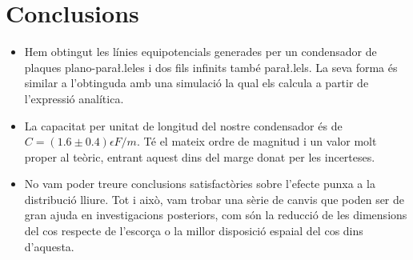 \section{Conclusions}
\begin{itemize}
	\item Hem obtingut les línies equipotencials generades per un condensador de plaques plano-para\l.leles i dos fils infinits també para\l.lels. La seva forma és similar a l'obtinguda amb una simulació la qual els calcula a partir de l'expressió analítica.
	\item La capacitat per unitat de longitud del nostre condensador és de $C=(1.6\pm0.4)\epsilon F/m$. Té el mateix ordre de magnitud i un valor molt proper al teòric, entrant aquest dins del marge donat per les incerteses.
	\item No vam poder treure conclusions satisfactòries sobre l'efecte punxa a la distribució lliure. Tot i això, vam trobar una sèrie de canvis que poden ser de gran ajuda en investigacions posteriors, com són la reducció de les dimensions del cos respecte de l'escorça o la millor disposició espaial del cos dins d'aquesta.
\end{itemize}
